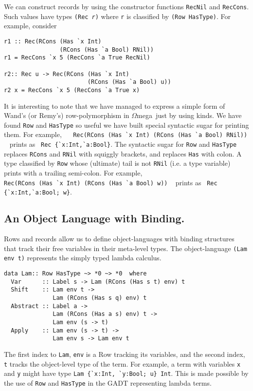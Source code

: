 \documentclass{sigplanconf}
\newcommand{\om}{$\Omega$mega}
\begin{document}
We can construct records by using the constructor functions
{\tt RecNil} and {\tt RecCons}. Such values have types
{\tt (Rec {\it r})} where {\tt r} is classified by {\tt (Row HasType)}. For example,
consider

\begin{verbatim}
r1 :: Rec(RCons (Has `x Int) 
                (RCons (Has `a Bool) RNil))
r1 = RecCons `x 5 (RecCons `a True RecNil)

r2:: Rec u -> Rec(RCons (Has `x Int) 
                        (RCons (Has `a Bool) u))
r2 x = RecCons `x 5 (RecCons `a True x)
\end{verbatim}

It is interesting to note that we have managed to express
a simple form of Wand's (or Remy's) row-polymorphism\cite{IC::Wand1991,94:2} in \om\ just by
using kinds.  We have found {\tt Row} and {\tt HasType} so useful we have built
special syntactic sugar for printing them. For example,~ ~
\verb+Rec(RCons (Has `x Int) (RCons (Has `a Bool) RNil))+ ~ prints
as~  \verb+Rec {`x:Int,`a:Bool}+.
The syntactic sugar for {\tt Row} and {\tt HasType} 
replaces {\tt RCons} and {\tt RNil} with squiggly brackets, and
replaces {\tt Has} with colon. A type classified by {\tt Row} whose
(ultimate) tail is not {\tt RNil} (i.e. a type variable) prints with a trailing semi-colon.
For example,\\ \verb+Rec(RCons (Has `x Int) (RCons (Has `a Bool) w))+ ~ prints
as~  \verb+Rec {`x:Int,`a:Bool; w}+.

\subsection{An Object Language with Binding.}\label{binding}

Rows and records allow us to define object-languages with binding structures
that track their free variables in their meta-level types. The object-language
{\tt (Lam env t)} represents the simply typed lambda calculus.

\begin{verbatim}
data Lam:: Row HasType ~> *0 ~> *0  where
  Var      :: Label s -> Lam (RCons (Has s t) env) t
  Shift    :: Lam env t -> 
              Lam (RCons (Has s q) env) t
  Abstract :: Label a -> 
              Lam (RCons (Has a s) env) t -> 
              Lam env (s -> t)
  Apply    :: Lam env (s -> t) -> 
              Lam env s -> Lam env t
\end{verbatim}

The first index to {\tt Lam}, {\tt env} is a Row tracking its variables,
and the second index, {\tt t} tracks the object-level type of the term.
For example, a term with variables {\tt x} and {\tt y} might have type
\verb+Lam {`x:Int, `y:Bool; u} Int+. This is made possible by the use
of {\tt Row} and {\tt HasType} in the GADT representing lambda terms.
\end{document}
